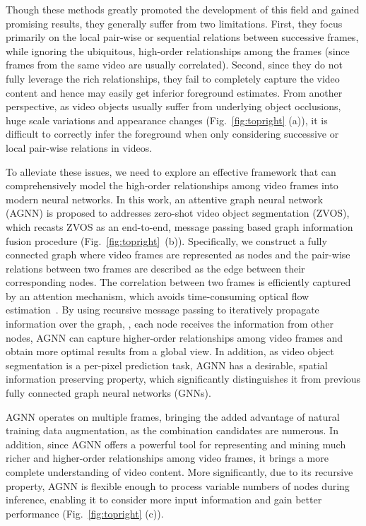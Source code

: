 \documentclass[10pt,twocolumn,letterpaper]{article}
\begin{document}
Though these methods greatly promoted the development of this field and gained promising results, they generally suffer from two limitations. First, they focus primarily on the local pair-wise or sequential relations between successive frames, while ignoring the ubiquitous, high-order relationships among the frames (since frames from the same video are usually correlated). Second, since they do not fully leverage the rich relationships, they fail to completely capture the video content and hence may easily get inferior foreground estimates. From another perspective, as video objects usually suffer from underlying object occlusions, huge scale variations and appearance changes (Fig.~\ref{fig:topright} (a)), it is difficult to correctly infer the foreground when only considering successive or local pair-wise relations in videos.

To alleviate these issues, we need to explore an effective framework that can comprehensively model the high-order relationships among video frames into modern neural networks. In this work, an attentive graph neural network (AGNN) is proposed to addresses zero-shot video object segmentation (ZVOS), which recasts ZVOS as an end-to-end, message passing based graph information fusion procedure (Fig.~\ref{fig:topright}~(b)). Specifically, we construct a fully connected graph where video frames are represented as nodes and the pair-wise relations between two frames are described as the edge between their corresponding nodes. The correlation between two frames is efficiently captured by an attention mechanism, which avoids time-consuming optical flow estimation~\cite{cheng2017segflow,DBLP:conf/cvpr/TokmakovAS17,jain2017fusionseg,DBLP:conf/iccv/TokmakovAS17,Li_2018_ECCV1}.
By using recursive message passing to iteratively propagate information over the graph, \ie, each node receives the information from other nodes, AGNN can capture higher-order relationships among video frames and obtain more optimal results from a global view. In addition, as video object segmentation is a per-pixel prediction task, AGNN has a desirable, spatial information preserving property, which significantly distinguishes it from previous fully connected graph neural networks (GNNs).

AGNN operates on multiple frames, bringing the added advantage of natural training data augmentation,  as the combination candidates are numerous. In addition, since AGNN offers a powerful tool for representing
and mining much richer and higher-order relationships among video frames, it brings a more complete understanding of video content.
More significantly, due to its recursive property, AGNN is flexible enough to process variable numbers of nodes during inference, enabling it  to consider more input information and gain better performance (Fig.~\ref{fig:topright} (c)).
\end{document}
